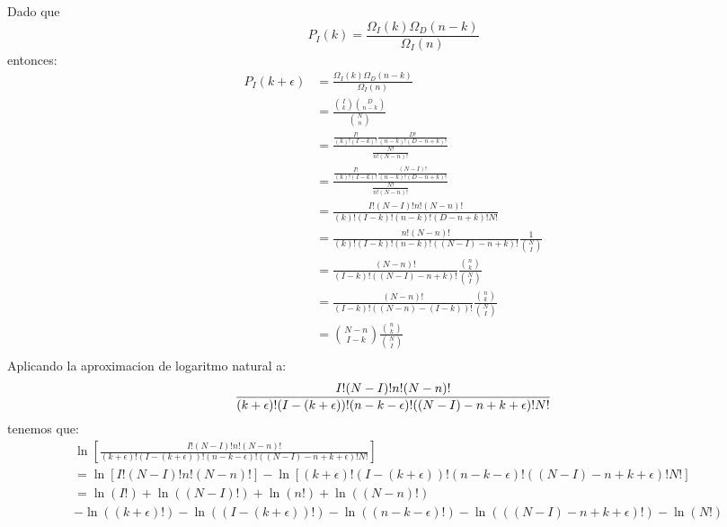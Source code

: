 \documentclass[a4paper]{article}
\begin{document}
    \begin{answer}[punto ]
        Dado que $$P_I(k) = \frac{\Omega_I(k) \Omega_D(n-k)}{\Omega_I(n)}$$
        entonces:
        \begin{align*}
            P_I(k + \epsilon) &= \frac{\Omega_I(k) \Omega_D(n-k)}{\Omega_I(n)} \\
            &= \frac{{I \choose k} {D \choose n - k}}{{N \choose n}} \\
            &= \frac{\frac{I!}{(k)!(I - k)!} \frac{D!}{(n - k)!(D - n + k)!}}{\frac {N!}{n!(N - n)!}} \\
            &= \frac{\frac{I!}{(k)!(I - k)!} \frac{(N-I)!}{(n - k)!(D - n + k)!}}{\frac {N!}{n!(N - n)!}} \\
            &= \frac{I!(N-I)!n!(N-n)!}{(k)!(I - k)!(n - k)!(D - n + k)!N!} \\
            &= \frac{n!(N-n)!}{(k)!(I - k)!(n - k)!((N-I) - n + k)!}\frac{1}{{N \choose I}} \\
            &= \frac{(N-n)!}{(I - k)!((N-I) - n + k)!}\frac{{n \choose k}}{{N \choose I}} \\
            &= \frac{(N-n)!}{(I - k)!((N-n) - (I - k))!}\frac{{n \choose k}}{{N \choose I}} \\
            &= {N-n \choose I - k}\frac{{n \choose k}}{{N \choose I}} \\
        \end{align*}
        Aplicando la aproximacion de logaritmo natural a:
        $$
         \frac{I!(N-I)!n!(N-n)!}{(k + \epsilon)!(I - (k+\epsilon))!(n - k-\epsilon)!((N-I) - n + k+\epsilon)!N!} \\
        $$
        tenemos que:
        \begin{align*}
            &\ln \left[
            \frac{I!(N-I)!n!(N-n)!}{(k + \epsilon)!(I - (k+\epsilon))!(n - k-\epsilon)!((N-I) - n + k+\epsilon)!N!}
            \right] \\
            &= \ln \left[I! (N-I)! n! (N-n)! \right] - \ln \left[(k + \epsilon)! (I - (k+\epsilon))! (n - k-\epsilon)! ((N-I) - n + k+\epsilon)! N! \right] \\
            &= \ln \left(I!\right) + \ln \left((N-I)!\right) + \ln \left(n!\right) + \ln \left((N-n)!\right) \\
            &- \ln \left((k + \epsilon)!\right) - \ln \left((I - (k+\epsilon))!\right) - \ln \left((n - k-\epsilon)!\right) - \ln \left(((N-I) - n + k+\epsilon)!\right) - \ln \left(N!\right)  \\
        \end{align*}

\end{answer}
\end{document}
